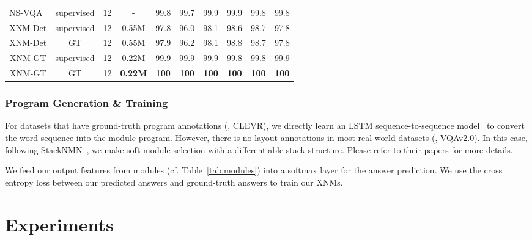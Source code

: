 \documentclass[10pt,twocolumn,letterpaper]{article}
\begin{document}
\begin{table*}[ht]
\begin{tabular}{|c|c|c|c||c|c|c|c|c|c|}
    \hline
    \hline
    NS-VQA~\cite{yi2018nsvqa}       &   supervised  &   12  &   -   &   99.8  & 99.7    & 99.9    & 99.9    & 99.8    & 99.8 \\
    XNM-Det  &   supervised  &   12  &   0.55M   &   97.8 & 96.0 & 98.1 & 98.6 & 98.7 & 97.8 \\
    XNM-Det  &   GT          &   12  &   0.55M   &   97.9 & 96.2 & 98.1 & 98.8 & 98.7 & 97.8 \\
    XNM-GT  &   supervised  &   12  &   0.22M   &   99.9 & 99.9 & 99.9 & 99.8 & 99.8 & 99.9 \\
    XNM-GT  &   GT          &   12  &   \textbf{0.22M}   &   \textbf{100}  & \textbf{100}  & \textbf{100}  & \textbf{100}  & \textbf{100}  & \textbf{100}  \\
    \hline
    \end{tabular}
    \label{tab:clevr-results}
\vspace{-0.3cm}
\end{table*}













\vspace{-0.2cm}
\subsubsection{Program Generation \& Training}
For datasets that have ground-truth program annotations (\eg, CLEVR), we directly learn an LSTM sequence-to-sequence model~\cite{sutskever2014sequence} to convert the word sequence into the module program.
However, there is no layout annotations in most real-world datasets (\eg, VQAv2.0). 
In this case, following StackNMN~\cite{hu2018explainable}, we make soft module selection with a differentiable stack structure.
Please refer to their papers for more details.

We feed our output features from modules (cf. Table~\ref{tab:modules}) into a softmax layer for the answer prediction. We use the cross entropy loss between our predicted answers and ground-truth answers to train our XNMs.






\vspace{-0.2cm}
\section{Experiments}\label{sec:exp}
\vspace{-0.1cm}
\end{document}
